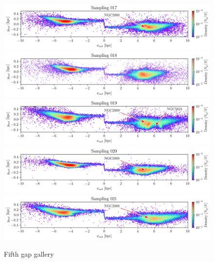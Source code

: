 \documentclass{aa}
\begin{document}
\begin{appendix}
    \begin{figure}
      \centering
      \includegraphics[width=\linewidth]{gallery_of_gaps_monte-carlo-017.png}
      \includegraphics[width=\linewidth]{gallery_of_gaps_monte-carlo-018.png}
      \includegraphics[width=\linewidth]{gallery_of_gaps_monte-carlo-019.png}      
      \includegraphics[width=\linewidth]{gallery_of_gaps_monte-carlo-020.png}
      \includegraphics[width=\linewidth]{gallery_of_gaps_monte-carlo-021.png}
      \caption{Fifth gap gallery}
      \label{fig:gallery4}
      \end{figure}        


\end{appendix}
\end{document}

